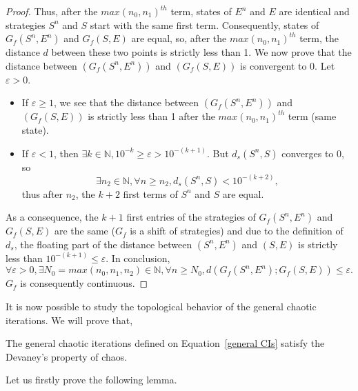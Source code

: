 \documentclass{article}
\begin{document}
\begin{proof}
Thus, after the $max(n_{0},n_{1})^{th}$ term, states of $E^n$ and $E$ are
identical and strategies $S^n$ and $S$ start with the same first term.\newline
Consequently, states of $G_{f}(S^n,E^n)$ and $G_{f}(S,E)$ are equal,
so, after the $max(n_0, n_1)^{th}$ term, the distance $d$ between these two points is strictly less than 1.\newline
\noindent We now prove that the distance between $\left(
G_{f}(S^n,E^n)\right) $ and $\left( G_{f}(S,E)\right) $ is convergent to
0. Let $\varepsilon >0$. \medskip
\begin{itemize}
\item If $\varepsilon \geqslant 1$, we see that the distance
between $\left( G_{f}(S^n,E^n)\right) $ and $\left( G_{f}(S,E)\right) $ is
strictly less than 1 after the $max(n_{0},n_{1})^{th}$ term (same state).
\medskip
\item If $\varepsilon <1$, then $\exists k\in \mathds{N},10^{-k}\geqslant
\varepsilon > 10^{-(k+1)}$. But $d_{s}(S^n,S)$ converges to 0, so
\begin{equation*}
\exists n_{2}\in \mathds{N},\forall n\geqslant
n_{2},d_{s}(S^n,S)<10^{-(k+2)},
\end{equation*}thus after $n_{2}$, the $k+2$ first terms of $S^n$ and $S$ are equal.
\end{itemize}
\noindent As a consequence, the $k+1$ first entries of the strategies of $G_{f}(S^n,E^n)$ and $G_{f}(S,E)$ are the same ($G_{f}$ is a shift of strategies) and due to the definition of $d_{s}$, the floating part of
the distance between $(S^n,E^n)$ and $(S,E)$ is strictly less than $10^{-(k+1)}\leqslant \varepsilon $.\bigskip \newline
In conclusion,
$$
\forall \varepsilon >0,\exists N_{0}=max(n_{0},n_{1},n_{2})\in \mathds{N},\forall n\geqslant N_{0},
 d\left( G_{f}(S^n,E^n);G_{f}(S,E)\right)
\leqslant \varepsilon .
$$
$G_{f}$ is consequently continuous.
\end{proof}


It is now possible to study the topological behavior of the general chaotic
iterations. We will prove that,

\begin{theorem}
\label{t:chaos des general}
 The general chaotic iterations defined on Equation~\ref{general CIs} satisfy
the Devaney's property of chaos.
\end{theorem}

Let us firstly prove the following lemma.
\end{document}
